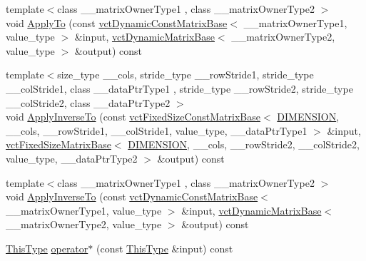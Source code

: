 \begin{DoxyCompactItemize}
\item 
{\footnotesize template$<$class \+\_\+\+\_\+matrix\+Owner\+Type1 , class \+\_\+\+\_\+matrix\+Owner\+Type2 $>$ }\\void \hyperlink{classvct_matrix_rotation3_const_base_adf7e3f5c1e4428e72e4ca671eef6447c}{Apply\+To} (const \hyperlink{classvct_dynamic_const_matrix_base}{vct\+Dynamic\+Const\+Matrix\+Base}$<$ \+\_\+\+\_\+matrix\+Owner\+Type1, value\+\_\+type $>$ \&input, \hyperlink{classvct_dynamic_matrix_base}{vct\+Dynamic\+Matrix\+Base}$<$ \+\_\+\+\_\+matrix\+Owner\+Type2, value\+\_\+type $>$ \&output) const 
\item 
{\footnotesize template$<$size\+\_\+type \+\_\+\+\_\+cols, stride\+\_\+type \+\_\+\+\_\+row\+Stride1, stride\+\_\+type \+\_\+\+\_\+col\+Stride1, class \+\_\+\+\_\+data\+Ptr\+Type1 , stride\+\_\+type \+\_\+\+\_\+row\+Stride2, stride\+\_\+type \+\_\+\+\_\+col\+Stride2, class \+\_\+\+\_\+data\+Ptr\+Type2 $>$ }\\void \hyperlink{classvct_matrix_rotation3_const_base_afd13fe59769456b1e904434344f17b4c}{Apply\+Inverse\+To} (const \hyperlink{classvct_fixed_size_const_matrix_base}{vct\+Fixed\+Size\+Const\+Matrix\+Base}$<$ \hyperlink{classvct_matrix_rotation3_const_base_a6bc9712dde55ee3fca0d7880feb6a903afdf02f4ad230d81f0ca2539c7feb61f3}{D\+I\+M\+E\+N\+S\+I\+O\+N}, \+\_\+\+\_\+cols, \+\_\+\+\_\+row\+Stride1, \+\_\+\+\_\+col\+Stride1, value\+\_\+type, \+\_\+\+\_\+data\+Ptr\+Type1 $>$ \&input, \hyperlink{classvct_fixed_size_matrix_base}{vct\+Fixed\+Size\+Matrix\+Base}$<$ \hyperlink{classvct_matrix_rotation3_const_base_a6bc9712dde55ee3fca0d7880feb6a903afdf02f4ad230d81f0ca2539c7feb61f3}{D\+I\+M\+E\+N\+S\+I\+O\+N}, \+\_\+\+\_\+cols, \+\_\+\+\_\+row\+Stride2, \+\_\+\+\_\+col\+Stride2, value\+\_\+type, \+\_\+\+\_\+data\+Ptr\+Type2 $>$ \&output) const 
\item 
{\footnotesize template$<$class \+\_\+\+\_\+matrix\+Owner\+Type1 , class \+\_\+\+\_\+matrix\+Owner\+Type2 $>$ }\\void \hyperlink{classvct_matrix_rotation3_const_base_a9bf0d05680ea22c07d7906813f515c39}{Apply\+Inverse\+To} (const \hyperlink{classvct_dynamic_const_matrix_base}{vct\+Dynamic\+Const\+Matrix\+Base}$<$ \+\_\+\+\_\+matrix\+Owner\+Type1, value\+\_\+type $>$ \&input, \hyperlink{classvct_dynamic_matrix_base}{vct\+Dynamic\+Matrix\+Base}$<$ \+\_\+\+\_\+matrix\+Owner\+Type2, value\+\_\+type $>$ \&output) const 
\item 
\hyperlink{classvct_matrix_rotation3_const_base_ad26bf016ce37ea0532e1ce0aa7bba8a0}{This\+Type} \hyperlink{classvct_matrix_rotation3_const_base_a9c381ea7eb0be99b27c142afbbbd559d}{operator$\ast$} (const \hyperlink{classvct_matrix_rotation3_const_base_ad26bf016ce37ea0532e1ce0aa7bba8a0}{This\+Type} \&input) const 

\end{DoxyCompactItemize}
